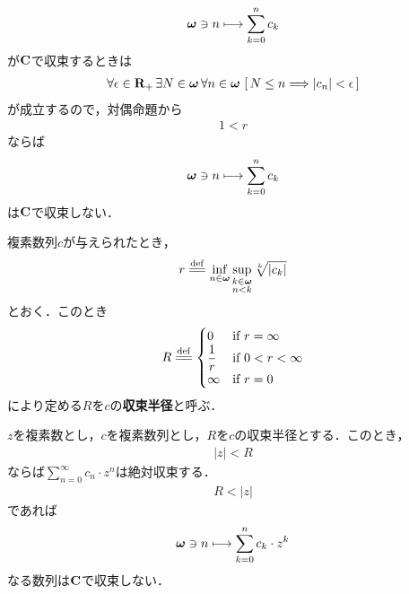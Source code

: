 \begin{sketch}
		\begin{align}
			{\boldsymbol \omega} \ni n \longmapsto \sum_{k=0}^{n} c_{k}
		\end{align}
		が$\mathbf{C}$で収束するときは
		\begin{align}
			\forall \epsilon \in \mathbf{R}_+\, \exists N \in {\boldsymbol \omega}\, \forall n \in {\boldsymbol \omega}\,
			\left[\, N \leq n \Longrightarrow |c_{n}| < \epsilon\, \right]
		\end{align}
		が成立するので，対偶命題から
		\begin{align}
			1 < r
		\end{align}
		ならば
		\begin{align}
			{\boldsymbol \omega} \ni n \longmapsto \sum_{k=0}^{n} c_{k}
		\end{align}
		は$\mathbf{C}$で収束しない．
		\QED
	\end{sketch}
	
	\begin{screen}
		\begin{dfn}[収束半径]
			複素数列$c$が与えられたとき，
			\begin{align}
				r \defeq \inf{n \in \Natural}{\sup{\substack{k \in \Natural \\ n < k}}{\sqrt[k]{|c_{k}|}}}
			\end{align}
			とおく．このとき
			\begin{align}
				R \defeq
				\begin{cases}
					0 & \mbox{if } r = \infty \\
					\displaystyle{\frac{1}{r}} & \mbox{if } \displaystyle{0 < r < \infty} \\
					\infty & \mbox{if } r = 0
				\end{cases}
			\end{align}
			により定める$R$を$c$の{\bf 収束半径}と呼ぶ．
		\end{dfn}
	\end{screen}
	
	\begin{screen}
		\begin{thm}
		\label{thm:absolutely_converge_inside_the_convergence_circle}
			$z$を複素数とし，$c$を複素数列とし，$R$を$c$の収束半径とする．このとき，
			\begin{align}
				|z| < R
			\end{align}
			ならば$\sum_{n=0}^{\infty} c_n \cdot z^n$は絶対収束する．
			\begin{align}
				R < |z|
			\end{align}
			であれば
			\begin{align}
				{\boldsymbol \omega} \ni n \longmapsto \sum_{k=0}^{n} c_{k} \cdot z^{k}
			\end{align}
			なる数列は$\mathbf{C}$で収束しない．
		\end{thm}
	\end{screen}
	
